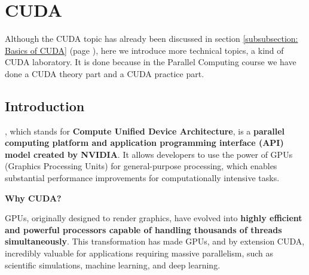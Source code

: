 \section{CUDA}

Although the CUDA topic has already been discussed in section \ref{subsubsection: Basics of CUDA} (page \pageref{subsubsection: Basics of CUDA}), here we introduce more technical topics, a kind of CUDA laboratory. It is done because in the Parallel Computing course we have done a CUDA theory part and a CUDA practice part.

\subsection{Introduction}

, which stands for \textbf{Compute Unified Device Architecture}, is a \textbf{parallel computing platform and application programming interface (API) model created by NVIDIA}. It allows developers to use the power of GPUs (Graphics Processing Units) for general-purpose processing, which enables substantial performance improvements for computationally intensive tasks.

\highspace
\begin{flushleft}
    \textcolor{Green3}{ \textbf{Why CUDA?}}
\end{flushleft}
GPUs, originally designed to render graphics, have evolved into \textbf{highly efficient and powerful processors capable of handling thousands of threads simultaneously}. This transformation has made GPUs, and by extension CUDA, incredibly valuable for applications requiring massive parallelism, such as scientific simulations, machine learning, and deep learning.

